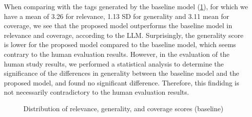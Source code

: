 When comparing with the tags generated by the baseline model (\cref{fig:gpt_baseline_score_distributions}), for which we have a mean of 3.26 for relevance, 1.13 SD for generality and 3.11 mean for coverage, we see that the proposed model outperforms the baseline model in relevance and coverage, according to the LLM. Surprisingly, the generality score is lower for the proposed model compared to the baseline model, which seems contrary to the human evaluation results. However, in the evaluation of the human study results, we performed a statistical analysis to determine the significance of the differences in generality between the baseline model and the proposed model, and found no significant difference. Therefore, this findidng is not necessarily contradictory to the human evaluation results.

\begin{figure}[h]
    \centering
    \hfill
    
    \caption{Distribution of relevance, generality, and coverage scores (baseline)}
    \label{fig:gpt_baseline_score_distributions}
\end{figure}

